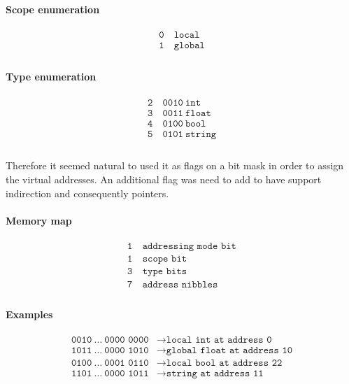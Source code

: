 \paragraph{Scope enumeration}

\begin{align*}
    \texttt{0} &\ \texttt{local}\\
    \texttt{1} &\ \texttt{global}\\
\end{align*}

\paragraph{Type enumeration}

\begin{align*}
    \texttt{2} &\ \texttt{0010}\ \texttt{int}\\
    \texttt{3} &\ \texttt{0011}\ \texttt{float}\\
    \texttt{4} &\ \texttt{0100}\ \texttt{bool}\\
    \texttt{5} &\ \texttt{0101}\ \texttt{string}\\
\end{align*}

\paragraph{} Therefore it seemed natural to used it as flags on a bit mask
in order to assign the virtual addresses. An additional flag was need to add
to have support indirection and consequently pointers.

\paragraph{Memory map}

\begin{align*}
    \texttt{1} &\ \texttt{addressing mode bit}\\
    \texttt{1} &\ \texttt{scope bit}\\
    \texttt{3} &\ \texttt{type bits}\\
    \texttt{7} &\ \texttt{address nibbles}\\
\end{align*}

\paragraph{Examples}
\begin{align*}
    \texttt{0010}\ \dots\ \texttt{0000 0000}
    &\rightarrow \texttt{local int at address 0}\\
    \texttt{1011}\ \dots\ \texttt{0000 1010}
    &\rightarrow \texttt{global float at address 10}\\
    \texttt{0100}\ \dots\ \texttt{0001 0110}
    &\rightarrow \texttt{local bool at address 22}\\
    \texttt{1101}\ \dots\ \texttt{0000 1011}
    &\rightarrow \texttt{string at address 11}\\
\end{align*}

